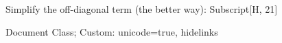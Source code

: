 Simplify the off-diagonal term (the better way): Subscript[H, 21]

Document Class; Custom: 
unicode=true, hidelinks